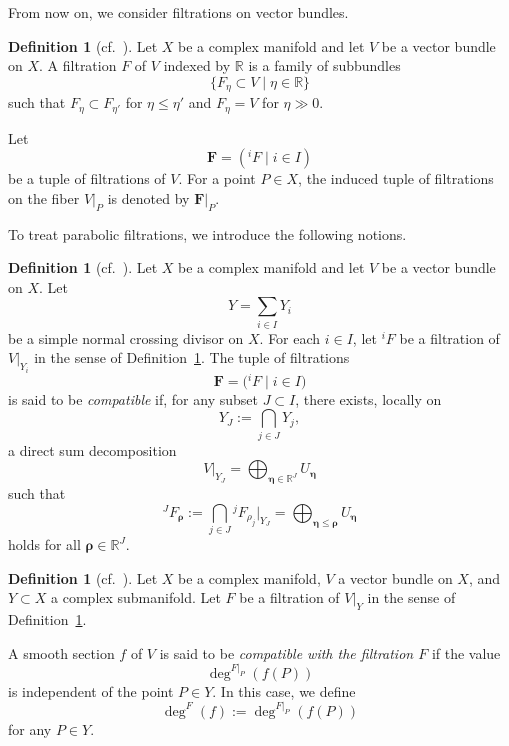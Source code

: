 \documentclass[12pt,twoside]{amsart}
\theoremstyle{definition}
\newtheorem{defn}[thm]{Definition}
\begin{document}
From now on, we consider filtrations on vector bundles.

\begin{defn}[{cf.~\cite[Definition 4.8]{mochizuki3}}]\label{x-def3.3}
Let $X$ be a complex manifold and let $V$ be a vector bundle on $X$.
A filtration $F$ of $V$ indexed by $\mathbb R$
is a family of subbundles  
\[
\{F_\eta \subset V \mid \eta\in\mathbb R\}
\]
such that $F_\eta\subset F_{\eta'}$ for $\eta\le\eta'$ and
$F_\eta=V$ for $\eta\gg 0$.

Let
\[
\mathbf F = ({}^i\!F \mid i\in I)
\]
be a tuple of filtrations of $V$.
For a point $P\in X$, the induced tuple of filtrations on the fiber
$V|_P$ is denoted by $\mathbf F|_P$.
\end{defn}

To treat parabolic filtrations, we introduce the following notions.

\begin{defn}[{cf.~\cite[Definition 3.12]{mochizuki2}}]\label{x-def3.4}
Let $X$ be a complex manifold and let $V$ be a vector bundle on $X$.
Let
\[
Y=\sum_{i\in I} Y_i
\]
be a simple normal crossing divisor on $X$.
For each $i\in I$, let ${}^i\!F$ be a filtration of $V|_{Y_i}$
in the sense of Definition~\ref{x-def3.3}.
The tuple of filtrations
\[
\mathbf F=\bigl({}^i\!F \mid i\in I\bigr)
\]
is said to be \emph{compatible} if, for any subset $J\subset I$,
there exists, locally on
\[
Y_J:=\bigcap_{j\in J} Y_j,
\]
a direct sum decomposition
\[
V|_{Y_J}=\bigoplus_{\bm\eta\in\mathbb R^J} U_{\bm\eta}
\]
such that
\[
{}^J\!F_{\bm\rho}
:=\bigcap_{j\in J} {}^j\!F_{\rho_j}\big|_{Y_J}
=
\bigoplus_{\bm\eta\le \bm\rho} U_{\bm\eta}
\]
holds for all $\bm\rho\in\mathbb R^J$.
\end{defn}

\begin{defn}[{cf.~\cite[Definition 2.16]{mochizuki1}}]\label{x-def3.5}
Let $X$ be a complex manifold, $V$ a vector bundle on $X$,
and $Y\subset X$ a complex submanifold.
Let $F$ be a filtration of $V|_Y$ in the sense of
Definition~\ref{x-def3.3}.

A smooth section $f$ of $V$ is said to be
\emph{compatible with the filtration $F$} if the value
\[
\deg^{F|_P}(f(P))
\]
is independent of the point $P\in Y$.
In this case, we define
\[
\deg^F(f) := \deg^{F|_P}(f(P))
\]
for any $P\in Y$.
\end{defn}
\end{document}
